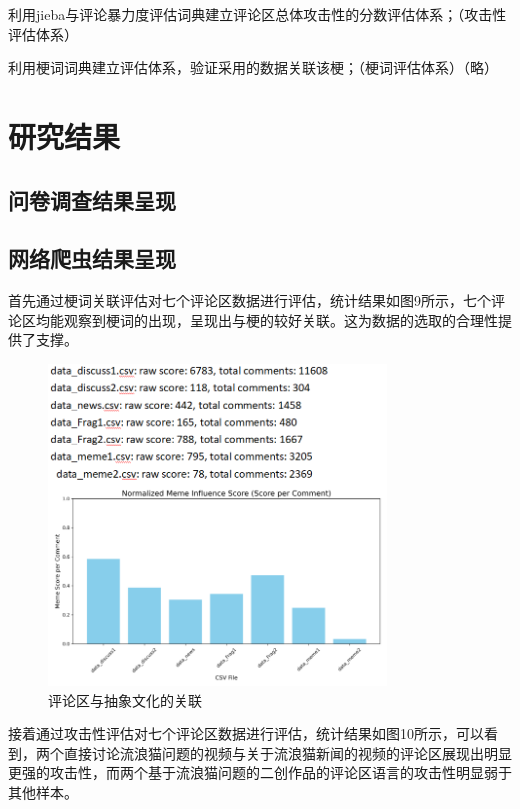 \documentclass[12pt,a4paper]{ctexart}
\begin{document}
利用jieba与评论暴力度评估词典建立评论区总体攻击性的分数评估体系；（攻击性评估体系）

利用梗词词典建立评估体系，验证采用的数据关联该梗；（梗词评估体系）（略）


\section{研究结果}

\subsection{问卷调查结果呈现}

\subsection{网络爬虫结果呈现}
首先通过梗词关联评估对七个评论区数据进行评估，统计结果如图9所示，七个评论区均能观察到梗词的出现，呈现出与梗的较好关联。这为数据的选取的合理性提供了支撑。

\begin{figure}[htbp]
    \centering
    \includegraphics[width=0.8\textwidth]{img/comment_area_vs_abstract.png}
    \caption{评论区与抽象文化的关联}
    \label{fig:comment_area_vs_abstract}
\end{figure}

接着通过攻击性评估对七个评论区数据进行评估，统计结果如图10所示，可以看到，两个直接讨论流浪猫问题的视频与关于流浪猫新闻的视频的评论区展现出明显更强的攻击性，而两个基于流浪猫问题的二创作品的评论区语言的攻击性明显弱于其他样本。
\end{document}
